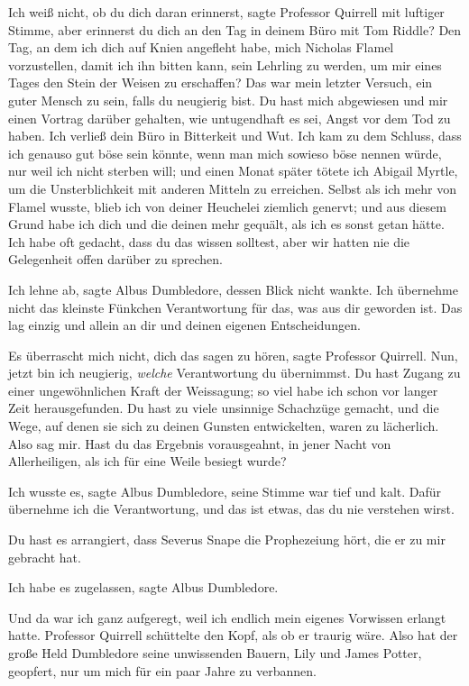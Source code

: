 \glqq{}Ich weiß nicht, ob du dich daran erinnerst\grqq{}, sagte Professor
Quirrell mit luftiger Stimme, \glqq{}aber erinnerst du dich an den Tag in deinem
Büro mit Tom Riddle? Den Tag, an dem ich dich auf Knien angefleht habe, mich
Nicholas Flamel vorzustellen, damit ich ihn bitten kann, sein Lehrling zu
werden, um mir eines Tages den Stein der Weisen zu erschaffen? Das war mein
letzter Versuch, ein guter Mensch zu sein, falls du neugierig bist. Du hast mich
abgewiesen und mir einen Vortrag darüber gehalten, wie untugendhaft es sei,
Angst vor dem Tod zu haben. Ich verließ dein Büro in Bitterkeit und Wut. Ich kam
zu dem Schluss, dass ich genauso gut böse sein könnte, wenn man mich sowieso
böse nennen würde, nur weil ich nicht sterben will; und einen Monat später
tötete ich Abigail Myrtle, um die Unsterblichkeit mit anderen Mitteln zu
erreichen. Selbst als ich mehr von Flamel wusste, blieb ich von deiner Heuchelei
ziemlich genervt; und aus diesem Grund habe ich dich und die deinen mehr
gequält, als ich es sonst getan hätte. Ich habe oft gedacht, dass du das wissen
solltest, aber wir hatten nie die Gelegenheit offen darüber zu sprechen.\grqq{}

\glqq{}Ich lehne ab\grqq{}, sagte Albus Dumbledore, dessen Blick nicht wankte.
\glqq{}Ich übernehme nicht das kleinste Fünkchen Verantwortung für das, was aus
dir geworden ist. Das lag einzig und allein an dir und deinen eigenen
Entscheidungen.\grqq{}

\glqq{}Es überrascht mich nicht, dich das sagen zu hören\grqq{}, sagte Professor
Quirrell. \glqq{}Nun, jetzt bin ich neugierig, \emph{welche} Verantwortung du
übernimmst. Du hast Zugang zu einer ungewöhnlichen Kraft der Weissagung; so viel
habe ich schon vor langer Zeit herausgefunden. Du hast zu viele unsinnige
Schachzüge gemacht, und die Wege, auf denen sie sich zu deinen Gunsten
entwickelten, waren zu lächerlich. Also sag mir. Hast du das Ergebnis
vorausgeahnt, in jener Nacht von Allerheiligen, als ich für eine Weile besiegt
wurde?\grqq{}

\glqq{}Ich wusste es\grqq{}, sagte Albus Dumbledore, seine Stimme war tief und
kalt. \glqq{}Dafür übernehme ich die Verantwortung, und das ist etwas, das du nie
verstehen wirst.\grqq{}

\glqq{}Du hast es arrangiert, dass Severus Snape die Prophezeiung hört, die er zu
mir gebracht hat.\grqq{}

\glqq{}Ich habe es zugelassen\grqq{}, sagte Albus Dumbledore.

\glqq{}Und da war ich ganz aufgeregt, weil ich endlich mein eigenes Vorwissen
erlangt hatte.\grqq{} Professor Quirrell schüttelte den Kopf, als ob er traurig
wäre. \glqq{}Also hat der große Held Dumbledore seine unwissenden Bauern, Lily
und James Potter, geopfert, nur um mich für ein paar Jahre zu verbannen.\grqq{}

